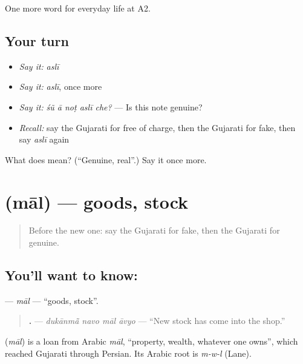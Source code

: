 \begin{grammarlens}[title={What you've built}]
One more word for everyday life at A2.
\end{grammarlens}

\subsection*{Your turn}
\begin{itemize}
\raggedright
  \item \emph{Say it:} \emph{aslī}
  \item \emph{Say it:} \emph{aslī}, once more
  \item \emph{Say it:} \emph{śũ ā noṭ aslī che?} — Is this note genuine?
  \item \emph{Recall:} say the Gujarati for free of charge, then the Gujarati for fake, then say \emph{aslī} again
\end{itemize}

\begin{tcolorbox}[breakable,colback=teal!4,colframe=teal!35!black,title={Before you move on}]
What does  mean? (\textquotedblleft{}Genuine, real\textquotedblright{}.) Say it once more.
\end{tcolorbox}
\section[\texorpdfstring{\gu{માલ} (māl)}{માલ (māl)}]{ (māl) — goods, stock}

\label{lesson:GU-C188-mal}



\begin{quote}
Before the new one: say the Gujarati for fake, then the Gujarati for genuine.
\end{quote}

\subsection*{You'll want to know: }
\textbf{} — \emph{māl} — \textquotedblleft{}goods, stock\textquotedblright{}.

\begin{quote}
\textbf{   .} — \emph{dukānmā̃ navo māl āvyo} — \textquotedblleft{}New stock has come into the shop.\textquotedblright{}
\end{quote}

\begin{cousinweb}
\textbf{} (\emph{māl}) is a loan from Arabic \emph{māl}, \textquotedblleft{}property, wealth, whatever one owns\textquotedblright{}, which reached Gujarati through Persian. Its Arabic root is \emph{m-w-l} (Lane).
\end{cousinweb}


